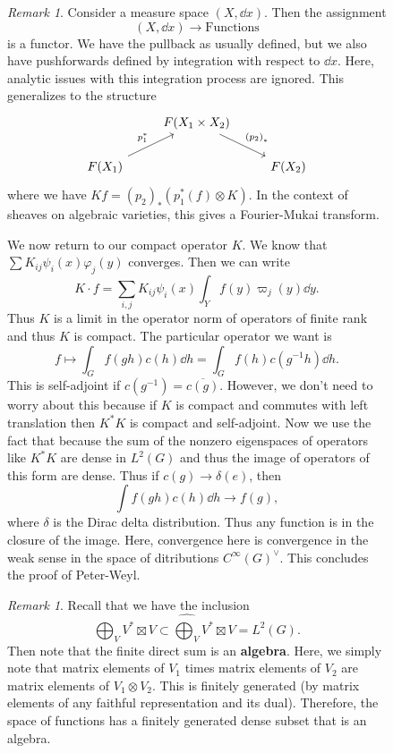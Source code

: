 \documentclass[leqno, openany]{memoir}
\theoremstyle{definition}
\theoremstyle{remark}
\newtheorem{rmk}[thm]{Remark}
\theoremstyle{plain}
\theoremstyle{definition}
\theoremstyle{remark}
\newcommand{\ol}[1]{\overline{#1}}
\newcommand{\wh}[1]{\widehat{#1}}
\begin{document}
\begin{figure}[H]
\begin{rmk} Consider a measure space $(X,\dd{x})$. Then the assignment \[
(X,\dd{x}) \longrightarrow \text{Functions} \] is a functor. We have the
pullback as usually defined, but we also have pushforwards defined by
integration with respect to $\dd{x}$. Here, analytic issues with this
integration process are ignored. This generalizes to the structure
\begin{equation*} \begin{tikzcd} & F(X_1 \times X_2) \arrow{dr}{{(p_2)}_*} \\
F(X_1) \arrow{ur}{p_1^*} & & F(X_2) \end{tikzcd} \end{equation*} where we have
$Kf = {(p_2)}_* (p_1^*(f) \otimes K)$. In the context of sheaves on algebraic
varieties, this gives a Fourier-Mukai transform.  \end{rmk}

We now return to our compact operator $K$. We know that $\sum K_{ij} \psi_i(x)
\varphi_j(y)$ converges. Then we can write \[ K \cdot f = \sum_{i,j} K_{ij}
\psi_i(x) \int_Y f(y) \varpi_j(y) \dd{y}. \] Thus $K$ is a limit in the
operator norm of operators of finite rank and thus $K$ is compact. The
particular operator we want is \[ f \mapsto \int_G f(gh) c(h) \dd{h} = \int_G
f(h) c(g^{-1}h) \dd{h}. \] This is self-adjoint if $c(g^{-1}) = \ol{c(g)}$.
However, we don't need to worry about this because if $K$ is compact and
commutes with left translation then $K^*K$ is compact and self-adjoint. Now we
use the fact that because the sum of the nonzero eigenspaces of operators like
$K^* K$ are dense in $L^2(G)$ and thus the image of operators of this form are
dense. Thus if $c(g) \to \delta(e)$, then \[ \int f(gh) c(h) \dd{h} \to f(g),
\] where $\delta$ is the Dirac delta distribution. Thus any function is in the
closure of the image. Here, convergence here is convergence in the weak sense
in the space of ditributions $C^{\infty}{(G)}^{\vee}$. This concludes the proof
of Peter-Weyl.

\begin{rmk} Recall that we have the inclusion \[ \bigoplus_V V^* \boxtimes V
\subset \wh{\bigoplus_V} V^* \boxtimes V = L^2(G). \] Then note that the finite
direct sum is an \textbf{algebra}. Here, we simply note that matrix elements of
$V_1$ times matrix elements of $V_2$ are matrix elements of $V_1 \otimes V_2$.
This is finitely generated (by matrix elements of any faithful representation
and its dual). Therefore, the space of functions has a finitely generated dense
subset that is an algebra.


\end{rmk}
\end{figure}
\end{document}
